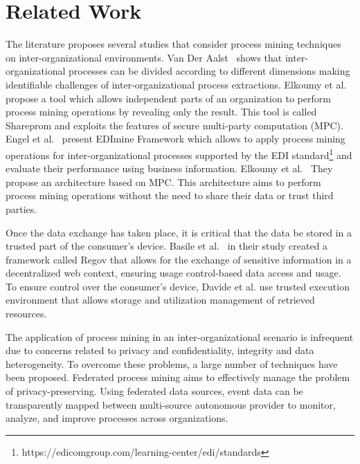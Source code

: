 \section{Related Work}
\label{sec:background}

The literature proposes several studies that consider process mining techniques on inter-organizational environments.  Van Der Aalst~\cite{van2011intra} shows that inter-organizational processes can be divided according to different dimensions making identifiable challenges of inter-organizational process extractions. Elkoumy et al.~\cite{elkoumy2020shareprom} propose a tool which allows independent parts of an organization to perform process mining operations by revealing only the result. This tool is called Shareprom and exploits the features of secure multi-party computation (MPC). Engel et al.~\cite{engel2016analyzing}
present EDImine Framework which allows to apply process mining operations for inter-organizational processes supported by the EDI standard\footnote{https://edicomgroup.com/learning-center/edi/standards} and evaluate their performance using business information.
Elkoumy et al.~\cite{elkoumy2020secure} They propose an architecture based on MPC. This architecture aims to perform process mining operations without the need to share their data or trust third parties.



\cite{hernandez2021merging}
\cite{claes2014merging}
Once the data exchange has taken place, it is critical that the data be stored in a trusted part of the consumer's device. Basile et al.~\cite{Basile_Blockchain_based_resource_governance_for_decentralized_web_environments} in their study created a framework called Regov that allows for the exchange of sensitive information in a decentralized web context, ensuring usage control-based data access and usage. To ensure control over the consumer's device, Davide et al. use trusted execution environment that allows storage and utilization management of retrieved resources. 

The application of process mining in an inter-organizational scenario is infrequent due to concerns related to privacy and confidentiality, integrity and data heterogeneity. To overcome these problems, a large number of techniques have been proposed. Federated process mining \cite{van2021federated} aims to effectively manage the problem of privacy-preserving. Using federated data sources, event data can be transparently mapped between multi-source autonomous provider to monitor, analyze, and improve processes across organizations.

